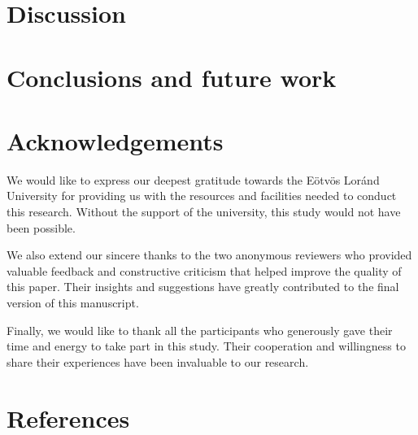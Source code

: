 \documentclass{article}
\begin{document}
\maketitle

\section{Discussion}


\maketitle

\section{Conclusions and future work}


\maketitle

\section{Acknowledgements}

We would like to express our deepest gratitude towards the Eötvös Loránd University for providing us with the resources and facilities needed to conduct this research. Without the support of the university, this study would not have been possible.

We also extend our sincere thanks to the two anonymous reviewers who provided valuable feedback and constructive criticism that helped improve the quality of this paper. Their insights and suggestions have greatly contributed to the final version of this manuscript.

Finally, we would like to thank all the participants who generously gave their time and energy to take part in this study. Their cooperation and willingness to share their experiences have been invaluable to our research.

\maketitle

\section{References}
\end{document}
